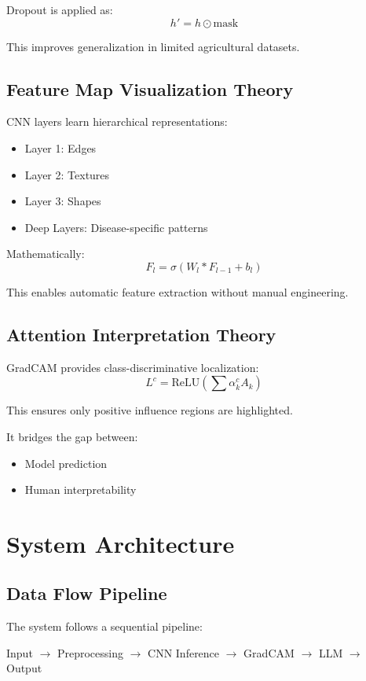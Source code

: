 \documentclass[journal,twocolumn,10pt]{IEEEtran}
\begin{document}
Dropout is applied as:
\begin{equation}
h' = h \odot \text{mask}
\end{equation}

This improves generalization in limited agricultural datasets.

\subsection{Feature Map Visualization Theory}
CNN layers learn hierarchical representations:
\begin{itemize}
\item Layer 1: Edges
\item Layer 2: Textures
\item Layer 3: Shapes
\item Deep Layers: Disease-specific patterns
\end{itemize}

Mathematically:
\begin{equation}
F_l = \sigma(W_l * F_{l-1} + b_l)
\end{equation}

This enables automatic feature extraction without manual engineering.

\subsection{Attention Interpretation Theory}
GradCAM provides class-discriminative localization:
\begin{equation}
L^c = \text{ReLU}(\sum \alpha_k^c A_k)
\end{equation}

This ensures only positive influence regions are highlighted.

It bridges the gap between:
\begin{itemize}
\item Model prediction
\item Human interpretability
\end{itemize}

\section{System Architecture}

\subsection{Data Flow Pipeline}
The system follows a sequential pipeline:
\begin{center}
Input $\rightarrow$ Preprocessing $\rightarrow$ CNN Inference $\rightarrow$ GradCAM $\rightarrow$ LLM $\rightarrow$ Output
\end{center}
\end{document}
